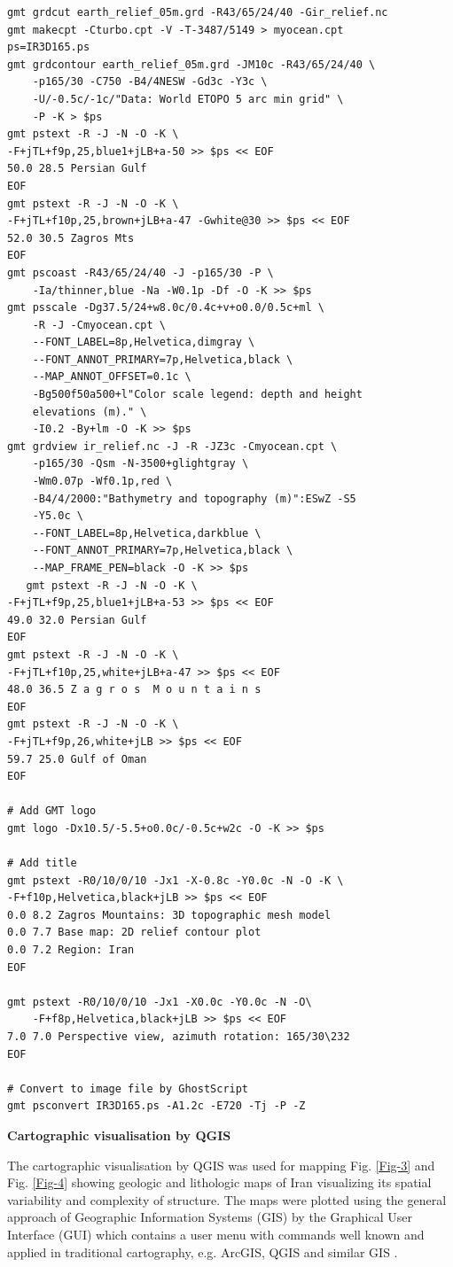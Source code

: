 \documentclass[12pt,a4paper,oneside]{article}
\def \newsubsection{\vspace{12pt}\textbf}
\begin{document}
\begin{lstlisting}[frame=single]
gmt grdcut earth_relief_05m.grd -R43/65/24/40 -Gir_relief.nc
gmt makecpt -Cturbo.cpt -V -T-3487/5149 > myocean.cpt
ps=IR3D165.ps
gmt grdcontour earth_relief_05m.grd -JM10c -R43/65/24/40 \
    -p165/30 -C750 -B4/4NESW -Gd3c -Y3c \
    -U/-0.5c/-1c/"Data: World ETOPO 5 arc min grid" \
    -P -K > $ps
gmt pstext -R -J -N -O -K \
-F+jTL+f9p,25,blue1+jLB+a-50 >> $ps << EOF
50.0 28.5 Persian Gulf
EOF
gmt pstext -R -J -N -O -K \
-F+jTL+f10p,25,brown+jLB+a-47 -Gwhite@30 >> $ps << EOF
52.0 30.5 Zagros Mts
EOF
gmt pscoast -R43/65/24/40 -J -p165/30 -P \
    -Ia/thinner,blue -Na -W0.1p -Df -O -K >> $ps
gmt psscale -Dg37.5/24+w8.0c/0.4c+v+o0.0/0.5c+ml \
    -R -J -Cmyocean.cpt \
    --FONT_LABEL=8p,Helvetica,dimgray \
    --FONT_ANNOT_PRIMARY=7p,Helvetica,black \
    --MAP_ANNOT_OFFSET=0.1c \
    -Bg500f50a500+l"Color scale legend: depth and height 
    elevations (m)." \
    -I0.2 -By+lm -O -K >> $ps
gmt grdview ir_relief.nc -J -R -JZ3c -Cmyocean.cpt \
    -p165/30 -Qsm -N-3500+glightgray \
    -Wm0.07p -Wf0.1p,red \
    -B4/4/2000:"Bathymetry and topography (m)":ESwZ -S5 
    -Y5.0c \
    --FONT_LABEL=8p,Helvetica,darkblue \
    --FONT_ANNOT_PRIMARY=7p,Helvetica,black \
    --MAP_FRAME_PEN=black -O -K >> $ps
   gmt pstext -R -J -N -O -K \
-F+jTL+f9p,25,blue1+jLB+a-53 >> $ps << EOF
49.0 32.0 Persian Gulf
EOF
gmt pstext -R -J -N -O -K \
-F+jTL+f10p,25,white+jLB+a-47 >> $ps << EOF
48.0 36.5 Z a g r o s  M o u n t a i n s
EOF
gmt pstext -R -J -N -O -K \
-F+jTL+f9p,26,white+jLB >> $ps << EOF
59.7 25.0 Gulf of Oman
EOF
    
# Add GMT logo
gmt logo -Dx10.5/-5.5+o0.0c/-0.5c+w2c -O -K >> $ps

# Add title
gmt pstext -R0/10/0/10 -Jx1 -X-0.8c -Y0.0c -N -O -K \
-F+f10p,Helvetica,black+jLB >> $ps << EOF
0.0 8.2 Zagros Mountains: 3D topographic mesh model
0.0 7.7 Base map: 2D relief contour plot
0.0 7.2 Region: Iran
EOF

gmt pstext -R0/10/0/10 -Jx1 -X0.0c -Y0.0c -N -O\
    -F+f8p,Helvetica,black+jLB >> $ps << EOF
7.0 7.0 Perspective view, azimuth rotation: 165/30\232
EOF

# Convert to image file by GhostScript
gmt psconvert IR3D165.ps -A1.2c -E720 -Tj -P -Z
\end{lstlisting}

\newsubsection{Cartographic visualisation by QGIS}

The cartographic visualisation by QGIS was used for mapping Fig. \ref{Fig-3} and Fig. \ref{Fig-4} showing geologic and lithologic maps of Iran visualizing its spatial variability and complexity of structure. The maps were plotted using the general approach of Geographic Information Systems (GIS) by the Graphical User Interface (GUI) which contains a user menu with commands well known and applied in traditional cartography, e.g. ArcGIS, QGIS and similar GIS \cite{Klaucoetal2013,Lemenkovaetal2012,Suetova,Lemenkova202124}. 
\end{document}
